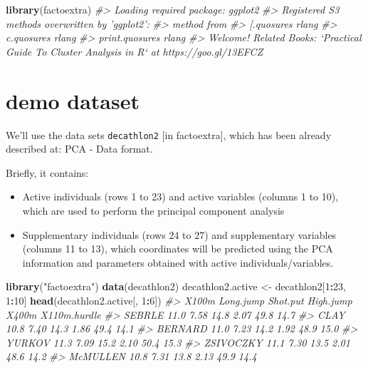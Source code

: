 \documentclass[]{book}
\newenvironment{Shaded}{\begin{snugshade}}{\end{snugshade}}
\newcommand{\CommentTok}[1]{\textcolor[rgb]{0.56,0.35,0.01}{\textit{#1}}}
\newcommand{\DecValTok}[1]{\textcolor[rgb]{0.00,0.00,0.81}{#1}}
\newcommand{\KeywordTok}[1]{\textcolor[rgb]{0.13,0.29,0.53}{\textbf{#1}}}
\newcommand{\NormalTok}[1]{#1}
\newcommand{\OperatorTok}[1]{\textcolor[rgb]{0.81,0.36,0.00}{\textbf{#1}}}
\newcommand{\StringTok}[1]{\textcolor[rgb]{0.31,0.60,0.02}{#1}}
\providecommand{\tightlist}{%
  \setlength{\itemsep}{0pt}\setlength{\parskip}{0pt}}
\begin{document}
\begin{Shaded}
\begin{Highlighting}[]
\KeywordTok{library}\NormalTok{(factoextra)}
\CommentTok{#> Loading required package: ggplot2}
\CommentTok{#> Registered S3 methods overwritten by 'ggplot2':}
\CommentTok{#>   method         from }
\CommentTok{#>   [.quosures     rlang}
\CommentTok{#>   c.quosures     rlang}
\CommentTok{#>   print.quosures rlang}
\CommentTok{#> Welcome! Related Books: `Practical Guide To Cluster Analysis in R` at https://goo.gl/13EFCZ}
\end{Highlighting}
\end{Shaded}

\hypertarget{demo-dataset}{%
\section{demo dataset}\label{demo-dataset}}

We'll use the data sets \texttt{decathlon2} {[}in factoextra{]}, which has been already described at: PCA - Data format.

Briefly, it contains:

\begin{itemize}
\tightlist
\item
  Active individuals (rows 1 to 23) and active variables (columns 1 to 10), which are used to perform the principal component analysis
\item
  Supplementary individuals (rows 24 to 27) and supplementary variables (columns 11 to 13), which coordinates will be predicted using the PCA information and parameters obtained with active individuals/variables.
\end{itemize}

\begin{Shaded}
\begin{Highlighting}[]
\KeywordTok{library}\NormalTok{(}\StringTok{"factoextra"}\NormalTok{)}
\KeywordTok{data}\NormalTok{(decathlon2)}
\NormalTok{decathlon2.active <-}\StringTok{ }\NormalTok{decathlon2[}\DecValTok{1}\OperatorTok{:}\DecValTok{23}\NormalTok{, }\DecValTok{1}\OperatorTok{:}\DecValTok{10}\NormalTok{]}
\KeywordTok{head}\NormalTok{(decathlon2.active[, }\DecValTok{1}\OperatorTok{:}\DecValTok{6}\NormalTok{])}
\CommentTok{#>           X100m Long.jump Shot.put High.jump X400m X110m.hurdle}
\CommentTok{#> SEBRLE     11.0      7.58     14.8      2.07  49.8         14.7}
\CommentTok{#> CLAY       10.8      7.40     14.3      1.86  49.4         14.1}
\CommentTok{#> BERNARD    11.0      7.23     14.2      1.92  48.9         15.0}
\CommentTok{#> YURKOV     11.3      7.09     15.2      2.10  50.4         15.3}
\CommentTok{#> ZSIVOCZKY  11.1      7.30     13.5      2.01  48.6         14.2}
\CommentTok{#> McMULLEN   10.8      7.31     13.8      2.13  49.9         14.4}
\end{Highlighting}
\end{Shaded}
\end{document}
